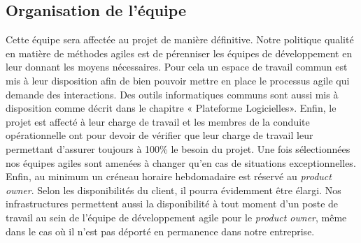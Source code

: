 \subsection{Organisation de l'équipe}
Cette équipe sera affectée au projet de manière définitive. Notre politique qualité en matière de méthodes agiles est de pérenniser les équipes de développement en leur donnant les moyens nécessaires. Pour cela un espace de travail commun est mis à leur disposition afin de bien pouvoir mettre en place le processus agile qui demande des interactions. Des outils informatiques communs sont aussi mis à disposition comme décrit dans le chapitre « Plateforme Logicielles». Enfin, le projet est affecté à leur charge de travail et les membres de la conduite opérationnelle ont pour devoir de vérifier que leur charge de travail leur permettant d’assurer toujours à 100\% le besoin du projet. Une fois sélectionnées nos équipes agiles sont amenées à changer qu’en cas de situations exceptionnelles. Enfin, au minimum un créneau horaire hebdomadaire est réservé au \textit{product owner}. Selon les disponibilités du client, il pourra évidemment être élargi. Nos infrastructures permettent aussi la disponibilité à tout moment d’un poste de travail au sein de l’équipe de développement agile pour le \textit{product owner}, même dans le cas où il n’est pas déporté en permanence dans notre entreprise.  
